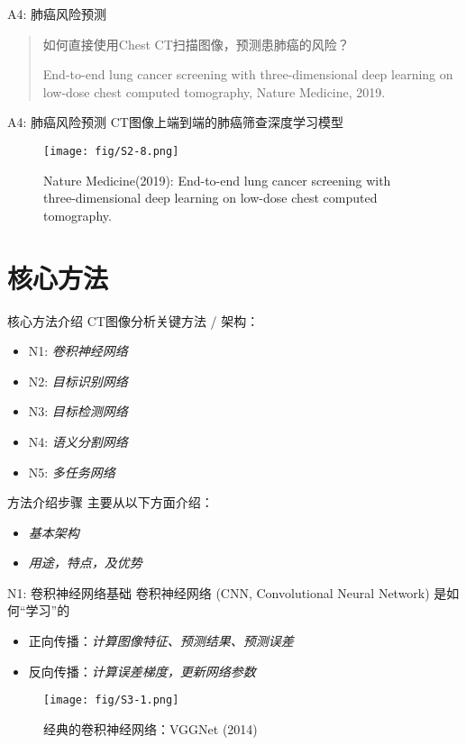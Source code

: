 \documentclass[10pt]{beamer}
\begin{document}
\begin{frame}{A4: 肺癌风险预测}
  \begin{quote}
    如何直接使用Chest CT扫描图像，预测患肺癌的风险？
    \vspace{5 mm}

    End-to-end lung cancer screening with three-dimensional deep learning on low-dose chest computed tomography, Nature Medicine, 2019.
  \end{quote}
\end{frame}

\begin{frame}{A4: 肺癌风险预测}
  CT图像上端到端的肺癌筛查深度学习模型

  \begin{figure}[htbp]
    \centering
    \texttt{[image: fig/S2-8.png]}
    \caption{Nature Medicine(2019): End-to-end lung cancer screening with three-dimensional deep learning on low-dose chest computed tomography.}
  \end{figure}
\end{frame}

\section{核心方法}

\begin{frame}{核心方法介绍}
  CT图像分析关键方法 / 架构：
  \begin{itemize}
    \item N1: \textit{卷积神经网络}
    \item N2: \textit{目标识别网络}
    \item N3: \textit{目标检测网络}
    \item N4: \textit{语义分割网络}
    \item N5: \textit{多任务网络}
  \end{itemize}
\end{frame}

\begin{frame}{方法介绍步骤}
  主要从以下方面介绍：
  \begin{itemize}
    \item \textit{基本架构}
    \item \textit{用途，特点，及优势}
  \end{itemize}
\end{frame}

\begin{frame}{N1: 卷积神经网络基础}
  卷积神经网络 (CNN, Convolutional Neural Network) 是如何“学习”的
  \begin{itemize}
    \item 正向传播：\textit{计算图像特征、预测结果、预测误差}
    \item 反向传播：\textit{计算误差梯度，更新网络参数}
  \end{itemize}
  \begin{figure}[htbp]
    \centering
    \texttt{[image: fig/S3-1.png]}
    \caption{经典的卷积神经网络：VGGNet (2014)}
  \end{figure}
\end{frame}
\end{document}
